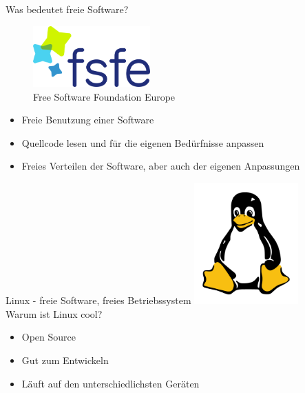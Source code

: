 \documentclass[utf8]{beamer}
\begin{document}
	\begin{frame}{Was bedeutet freie Software?}
	\begin{figure}
		\centering\includegraphics[width=0.4\textwidth]{img/Free_Software_Foundation_Europe,_logo.png}\\
		Free Software Foundation Europe
	\end{figure}
		
		\begin{itemize}
			\item Freie Benutzung einer Software
			\item Quellcode lesen und für die eigenen Bedürfnisse anpassen
			\item Freies Verteilen der Software, aber auch der eigenen Anpassungen
		\end{itemize}
	\end{frame}
	
	\begin{frame}{Linux - freie Software, freies Betriebssystem}
	\centering\includegraphics[width=0.3\textwidth]{img/Tux-simple.png}\\
		Warum ist Linux cool?
		\begin{itemize}
			\item Open Source
			\item Gut zum Entwickeln
			\item Läuft auf den unterschiedlichsten Geräten
		\end{itemize}
	\end{frame}
	
\end{document}

